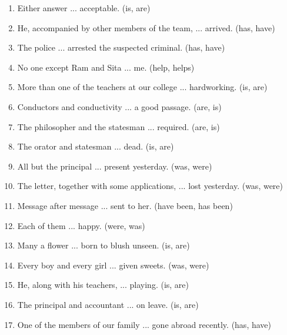 \documentclass[12pt]{article}
\begin{document}
\begin{enumerate}
    \item Either answer ... acceptable. \hfill (is, are)

    \item He, accompanied by other members of the team, ... arrived. \hfill (has, have)

    \item The police ... arrested the suspected criminal. \hfill (has, have)

    \item No one except Ram and Sita ... me. \hfill (help, helps)

    \item More than one of the teachers at our college ... hardworking. \hfill (is, are)

    \item Conductors and conductivity ... a good passage. \hfill (are, is)

    \item The philosopher and the statesman ... required. \hfill (are, is)

    \item The orator and statesman ... dead. \hfill (is, are)

    \item All but the principal ... present yesterday. \hfill (was, were)

    \item The letter, together with some applications, ... lost yesterday. \hfill (was, were)

    \item Message after message ... sent to her. \hfill (have been, has been)

    \item Each of them ... happy. \hfill (were, was)

    \item Many a flower ... born to blush unseen. \hfill (is, are)

    \item Every boy and every girl ... given sweets. \hfill (was, were)

    \item He, along with his teachers, ... playing. \hfill (is, are)

    \item The principal and accountant ... on leave. \hfill (is, are)

    \item One of the members of our family ... gone abroad recently. \hfill (has, have)


\end{enumerate}
\end{document}
